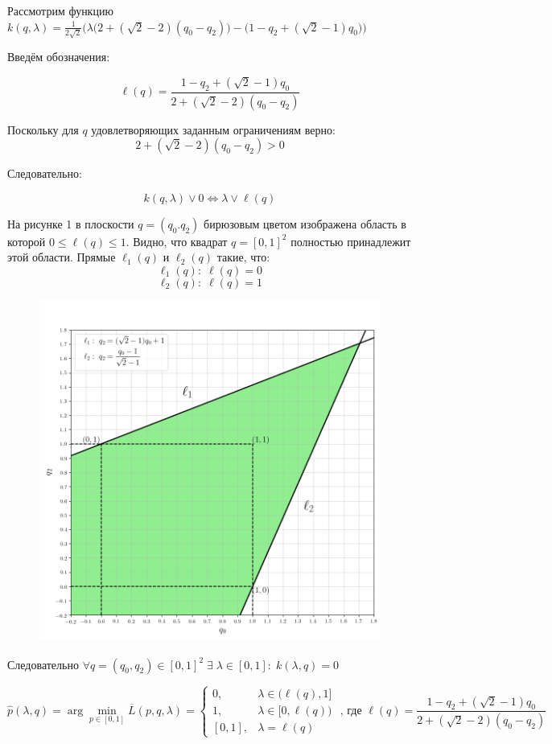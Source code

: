 \begin{flushleft}
	Рассмотрим функцию $k(q, \lambda)=\frac{1}{2\sqrt{2}}
	\Big(
		\lambda \big (2+(\sqrt{2}-2)(q_0-q_2) \big) -
		\big (1 - q_2 + (\sqrt{2} - 1)q_0 \big)
	\Big)
	$

	Введём обозначения:
	
	$$\ell(q) = \frac{1 - q_2 + (\sqrt{2} - 1)q_0}{2+(\sqrt{2}-2)(q_0-q_2)}$$	
	
	Поскольку для $q$ удовлетворяющих заданным ограничениям	верно: 
	$$2+(\sqrt{2}-2)(q_0-q_2) > 0$$
	
	Следовательно:
	
	$$
	k(q, \lambda) \vee 0 \Leftrightarrow 
	\lambda \vee \ell(q)
	$$
	
	На рисунке 1 в плоскости $q=(q_0.q_2)$ бирюзовым 
	цветом изображена область в которой $0 \leqslant \ell(q) \leqslant 1$.
	Видно, что квадрат $q = [0,1]^2$ полностью принадлежит этой области.
	Прямые $\ell_1(q)$ и $\ell_2(q)$ такие, что:
	$$\ell_1(q): \; \ell(q)=0 $$
	$$\ell_2(q): \; \ell(q)=1 $$
	
	\begin{figure}[H]
		\centering
  		\includegraphics[scale=0.5]{images/graf_3_1}
  		\caption{}
	\end{figure}
	
	Следовательно $\forall q=(q_0, q_2) \in [0,1]^2 \;
	\exists \; \lambda \in [0,1]: \; k(\lambda,q)=0$  
	
	$$
		\hat p(\lambda,q)=
		\arg \min \limits_{p \in [0, 1]} \overline{L}(p,q,\lambda)=
		\begin{cases}
			0, & \lambda \in \big(\ell (q), 1\big] \\
			1, & \lambda \in \big[0, \ell(q) \big) \\
			[0,1], & \lambda=\ell(q)
		\end{cases}
		\textrm{ , где } \ell(q)=
		\frac{1 - q_2 + (\sqrt{2} - 1)q_0}{2+(\sqrt{2}-2)(q_0-q_2)}
	$$	
	
\end{flushleft}